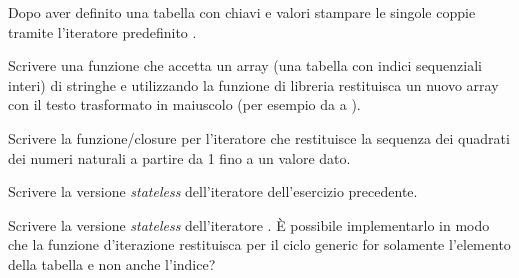 \begin{Exercise}[label=iter-01]
Dopo aver definito una tabella con chiavi e valori stampare le singole coppie
tramite l'iteratore predefinito .
\end{Exercise}

\begin{Exercise}[label=iter-02]
Scrivere una funzione che accetta un array (una tabella con indici sequenziali
interi) di stringhe e utilizzando la funzione di libreria 
restituisca un nuovo array con il testo trasformato in maiuscolo (per esempio da
 a ).
\end{Exercise}

\begin{Exercise}[label=iter-03]
Scrivere la funzione/closure per l'iteratore che restituisce la sequenza dei
quadrati dei numeri naturali a partire da 1 fino a un valore dato.
\end{Exercise}

\begin{Exercise}[label=iter-04]
Scrivere la versione \emph{stateless} dell'iteratore dell'esercizio precedente.
\end{Exercise}

\begin{Exercise}[label=iter-05]
Scrivere la versione \emph{stateless} dell'iteratore . È possibile
implementarlo in modo che la funzione d'iterazione restituisca per il ciclo
generic for solamente l'elemento della tabella e non anche l'indice?
\end{Exercise}


